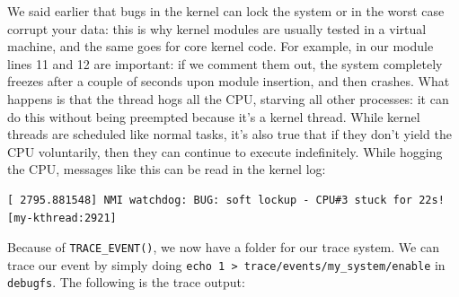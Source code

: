 \documentclass[10pt]{book}
\begin{document}
We said earlier that bugs in the kernel can lock the system or in the worst case corrupt your data: this is why kernel modules are usually tested in a virtual machine, and the same goes for core kernel code. For example, in our module lines 11 and 12 are important: if we comment them out, the system completely freezes after a couple of seconds upon module insertion, and then crashes. What happens is that the thread hogs all the CPU, starving all other processes: it can do this without being preempted because it's a kernel thread. While kernel threads are scheduled like normal tasks, it's also true that if they don't yield the CPU voluntarily, then they can continue to execute indefinitely. %
While hogging the CPU, messages like this can be read in the kernel log:
\begin{Verbatim}
[ 2795.881548] NMI watchdog: BUG: soft lockup - CPU#3 stuck for 22s! [my-kthread:2921]    
\end{Verbatim}
Because of \verb|TRACE_EVENT()|, we now have a folder for our trace system. We can trace our event by simply doing \verb|echo 1 > trace/events/my_system/enable| in \verb|debugfs|. The following is the trace output:
\end{document}
